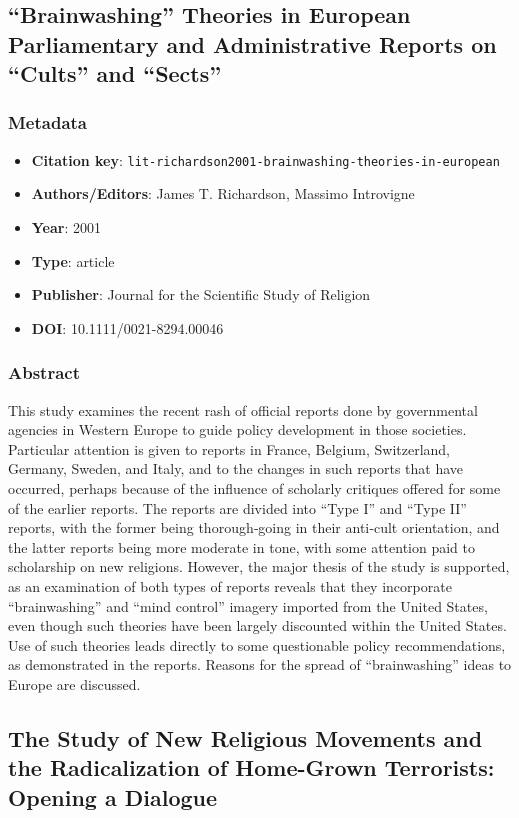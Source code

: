 \subsection{“Brainwashing” Theories in European Parliamentary and Administrative Reports on “Cults” and “Sects”}\label{lit:lit-richardson2001-brainwashing-theories-in-european}
\subsubsection*{Metadata}
\begin{itemize}
  \item \textbf{Citation key}: \texttt{lit-richardson2001-brainwashing-theories-in-european}
  \item \textbf{Authors/Editors}: James T. Richardson, Massimo Introvigne
  \item \textbf{Year}: 2001
  \item \textbf{Type}: article
  \item \textbf{Publisher}: Journal for the Scientific Study of Religion
  \item \textbf{DOI}: 10.1111/0021-8294.00046
\end{itemize}
\subsubsection*{Abstract}
This study examines the recent rash of official reports done by governmental agencies in Western Europe to guide policy development in those societies. Particular attention is given to reports in France, Belgium, Switzerland, Germany, Sweden, and Italy, and to the changes in such reports that have occurred, perhaps because of the influence of scholarly critiques offered for some of the earlier reports. The reports are divided into “Type I” and “Type II” reports, with the former being thorough‐going in their anti‐cult orientation, and the latter reports being more moderate in tone, with some attention paid to scholarship on new religions. However, the major thesis of the study is supported, as an examination of both types of reports reveals that they incorporate “brainwashing” and “mind control” imagery imported from the United States, even though such theories have been largely discounted within the United States. Use of such theories leads directly to some questionable policy recommendations, as demonstrated in the reports. Reasons for the spread of “brainwashing” ideas to Europe are discussed.

\subsection{The Study of New Religious Movements and the Radicalization of Home-Grown Terrorists: Opening a Dialogue}\label{lit:lit-dawson2009-the-study-of-new}
